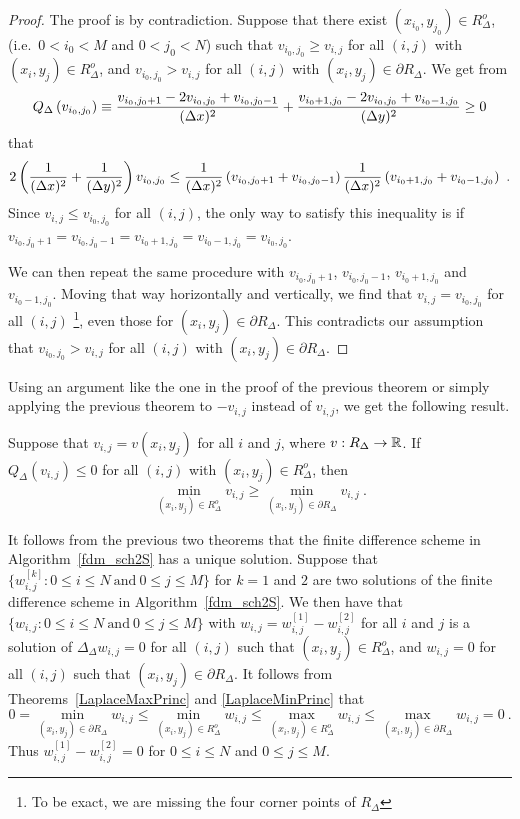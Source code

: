 \begin{proof}
The proof is by contradiction.  Suppose that there exist
$(x_{i_0},y_{j_0}) \in R^o_\Delta$, (i.e.\ $0 < i_0 < M$
and $0 < j_0 < N$) such that $v_{i_0,j_0} \geq v_{i,j}$ for all
$(i,j)$ with $(x_i,y_j) \in R^o_\Delta$, and
$v_{i_0,j_0} > v_{i,j}$ for all $(i,j)$ with
$(x_i,y_j) \in \partial R_\Delta$.  We get from
\[
Q_\Delta\left(v_{i_0,j_0}\right)
\equiv \frac{v_{i_0,j_0+1} - 2v_{i_0,j_0} + v_{i_0,j_0-1}}{(\Delta{x})^2}
+ \frac{v_{i_0+1,j_0} - 2v_{i_0,j_0} + v_{i_0-1,j_0}}{(\Delta{y})^2}
\geq 0
\]
that
\[
2\left( \frac{1}{(\dtx{x})^2} + \frac{1}{(\dtx{y})^2} \right) v_{i_0,j_0} \\
\leq \frac{1}{(\dtx{x})^2} \left( v_{i_0,j_0+1} + v_{i_0,j_0-1} \right)
\frac{1}{(\dtx{x})^2} \left( v_{i_0+1,j_0} + v_{i_0-1,j_0} \right) \ .
\]
Since $v_{i,j} \leq v_{i_0,j_0}$ for all $(i,j)$, the only way to satisfy this
inequality is if
$v_{i_0,j_0+1}= v_{i_0,j_0-1} = v_{i_0+1,j_0} = v_{i_0-1,j_0} = v_{i_0,j_0}$.

We can then repeat the same procedure with $v_{i_0,j_0+1}$,
$v_{i_0,j_0-1}$, $v_{i_0+1,j_0}$ and $v_{i_0-1,j_0}$.  Moving that way
horizontally and vertically, we find that $v_{i,j} = v_{i_0,j_0}$ for all
$(i,j)$ \footnote{To be exact, we are missing the four corner points
of $R_\Delta$}, even those for $(x_i,y_j) \in \partial R_\Delta$.  This
contradicts our assumption that
$v_{i_0,j_0} > v_{i,j}$ for all $(i,j)$ with
$(x_i,y_j) \in \partial R_\Delta$.
\end{proof}

Using an argument like the one in the proof of the previous
theorem or simply applying the previous theorem to
$-v_{i,j}$ instead of $v_{i,j}$, we get the following result.

\begin{theorem} \label{LaplaceMinPrinc}
Suppose that $v_{i,j} = v(x_i,y_j)$ for all $i$ and $j$, where
$v:R_\Delta \to \mathbb{R}$.  If $Q_\Delta(v_{i,j}) \leq 0$ for all $(i,j)$ with
$(x_i,y_j)\in R^o_\Delta$, then
\[
  \min_{(x_i,y_j) \in R^o_\Delta} v_{i,j}
  \geq \min_{(x_i,y_j) \in \partial R_\Delta} v_{i,j} \ .
\]  
\end{theorem}

It follows from the previous two theorems that the finite
difference scheme in Algorithm~\ref{fdm_sch2S} has a unique solution.
Suppose that
$\{ w_{i,j}^{[k]} : 0\leq i \leq N \ \text{and} \ 0 \leq j \leq M\}$
for $k=1$ and $2$ are two solutions of the finite
difference scheme in Algorithm~\ref{fdm_sch2S}.  We then have that
$\{ w_{i,j} : 0\leq i \leq N \ \text{and} \ 0 \leq j \leq M\}$
with $w_{i,j} = w_{i,j}^{[1]} - w_{i,j}^{[2]}$ for all $i$ and $j$ is
a solution of $\displaystyle \Delta_\Delta w_{i,j} = 0$ for all $(i,j)$
such that $(x_i,y_j) \in R^o_\Delta$, and $w_{i,j} = 0$ for all
$(i,j)$ such that $(x_i,y_j) \in \partial R_\Delta$.  It follows from
Theorems~\ref{LaplaceMaxPrinc} and \ref{LaplaceMinPrinc} that
\[
0 = \min_{(x_i,y_j) \in \partial R_\Delta} w_{i,j}
\leq \min_{(x_i,y_j) \in R^o_\Delta} w_{i,j}
\leq \max_{(x_i,y_j) \in R^o_\Delta} w_{i,j}
\leq \max_{(x_i,y_j) \in \partial R_\Delta} w_{i,j} = 0 \ .
\]
Thus $w_{i,j}^{[1]} - w_{i,j}^{[2]} = 0$ for $0\leq i \leq N$ and
$0\leq j \leq M$.

